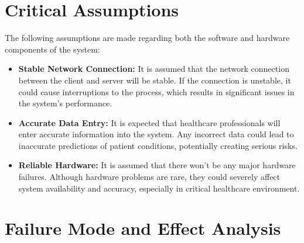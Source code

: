 \documentclass{article}
\begin{document}
\section{Critical Assumptions}


The following assumptions are made regarding both the software and hardware components of the system:

\begin{itemize}
    \item \textbf{Stable Network Connection:} It is assumed that the network connection between the client and server will be stable. If the connection is unstable, it could cause interruptions to the process, which results in significant issues in the system’s performance.
    
    \item \textbf{Accurate Data Entry:} It is expected that healthcare professionals will enter accurate information into the system. Any incorrect data could lead to inaccurate predictions of patient conditions, potentially creating serious risks.
    
    \item \textbf{Reliable Hardware:} It is assumed that there won’t be any major hardware failures. Although hardware problems are rare, they could severely affect system availability and accuracy, especially in critical healthcare environment.
    
\end{itemize}

\section{Failure Mode and Effect Analysis}
\end{document}
